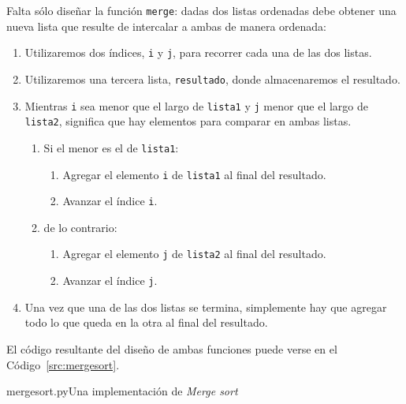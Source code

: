 Falta sólo diseñar la función \lstinline!merge!: dadas dos listas ordenadas
debe obtener una nueva lista que resulte de intercalar a ambas de manera
ordenada:

\begin{enumerate}
\item Utilizaremos dos índices, \lstinline!i! y \lstinline!j!, para recorrer
cada una de las dos listas.
\item Utilizaremos una tercera lista, \lstinline!resultado!, donde
almacenaremos el resultado.

\item Mientras \lstinline!i! sea menor que el largo de \lstinline!lista1! y
\lstinline!j! menor que el largo de \lstinline!lista2!, significa que hay
elementos para comparar en ambas listas.

\begin{enumerate}
\item Si el menor es el de \lstinline!lista1!:
\begin{enumerate}
\item Agregar el elemento \lstinline!i! de \lstinline!lista1! al final del
resultado.
\item Avanzar el índice \lstinline!i!.
\end{enumerate}
\item de lo contrario:
\begin{enumerate}
\item Agregar el elemento \lstinline!j! de \lstinline!lista2! al final del
resultado.
\item Avanzar el índice \lstinline!j!.
\end{enumerate}

\end{enumerate}

\item Una vez que una de las dos listas se termina, simplemente hay que
agregar todo lo que queda en la otra al final del resultado.
\end{enumerate}

El código resultante del diseño de ambas funciones puede verse en el
Código~\ref{src:mergesort}.

\begin{codigo}{mergesort.py}{Una implementación de \emph{Merge sort}}

\label{src:mergesort}
\end{codigo}

